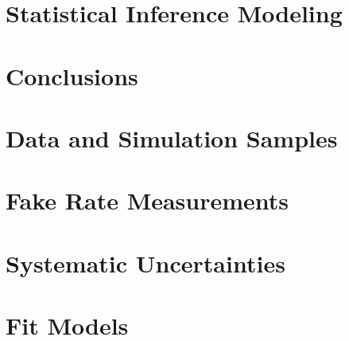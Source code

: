 \documentclass[phd,black]{PrincetonThesis}
\begin{document}
\chapter{Statistical Inference Modeling}
\label{chap:stat}



\chapter{Conclusions}
\label{chap:conclusions}




\appendix
\chapter{Data and Simulation Samples}
\label{app:data}


\chapter{Fake Rate Measurements}
\label{app:ffmeas}


\chapter{Systematic Uncertainties}
\label{app:sysunc}


\chapter{Fit Models}
\label{app:fitmodel}


\cleardoublepage
\end{document}
